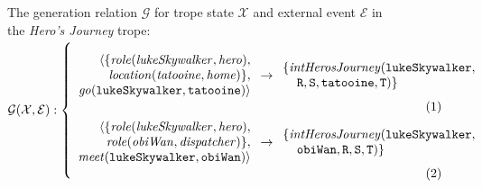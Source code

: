 \documentclass[11pt]{report}
\begin{document}
\begin{figure}[!t]
\small
The generation relation $\mathcal{G}$ for trope state $\mathcal{X}$ and external event $\mathcal{E}$ in the \emph{Hero's Journey} trope:\\ 
$\mathcal{G(X, E)}:\left\{\mbox{%
\begin{minipage}[c]{0.85\textwidth}
\begin{align}
\begin{array}{r}
\langle \{\mathit{role(lukeSkywalker, hero)},\\
\mathit{location(tatooine, home)}\},\\
\mathit{go}\mathtt{(lukeSkywalker, tatooine)} \rangle
\end{array}
&\rightarrow
\begin{array}{l}
\{\mathit{intHerosJourney}\mathtt{(lukeSkywalker,}\\\;\;\;\;\mathtt{R, S, tatooine, T)}\}
\end{array}\label{eq:tatooine}\\
\begin{array}{r}
                                 \langle \{\mathit{role(lukeSkywalker, hero)},\\
  \mathit{role(obiWan, dispatcher)}\},\\
\mathit{meet}\mathtt{(lukeSkywalker, obiWan)} \rangle
\end{array}
&\rightarrow
\begin{array}{l}
\{\mathit{intHerosJourney}\mathtt{(lukeSkywalker,}\\\;\;\;\;\mathtt{obiWan, R, S, T)}\}
\end{array}\label{eq:hsnth}
\end{align}
\end{minipage}
}\right.$\smallskip


\end{figure}
\end{document}
